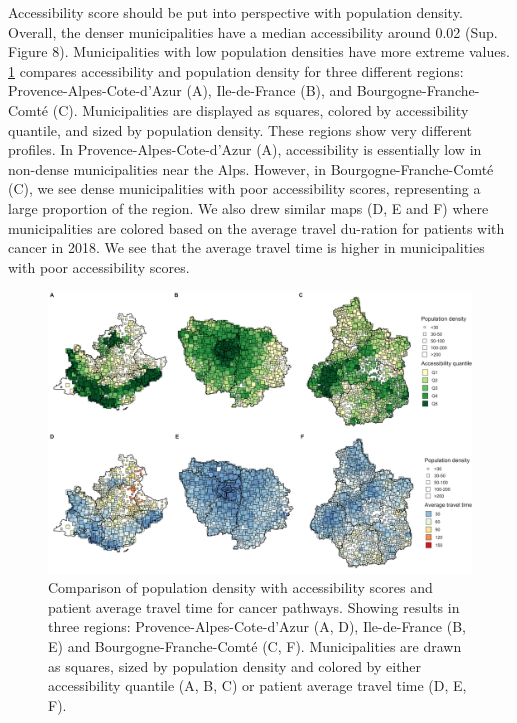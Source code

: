 Accessibility score should be put into perspective with population density. Overall, the denser municipalities have a median accessibility around 0.02 (Sup. Figure 8). Municipalities with low population densities have more extreme values.  \cref{fig:accessibility-vs-density} compares accessibility and population density for three different regions: Provence-Alpes-Cote-d'Azur (A), Ile-de-France (B), and Bourgogne-Franche-Comté (C). Municipalities are displayed as squares, colored by accessibility quantile, and sized by population density. These regions show very different profiles. In Provence-Alpes-Cote-d'Azur (A), accessibility is essentially low in non-dense municipalities near the Alps. However, in Bourgogne-Franche-Comté (C), we see dense municipalities with poor accessibility scores, representing a large proportion of the region. We also drew similar maps (D, E and F) where municipalities are colored based on the average travel du-ration for patients with cancer in 2018. We see that the average travel time is higher in municipalities with poor accessibility scores.

\begin{figure}[h]
    \includegraphics[width=\textwidth]{images/camion/fig3_accessibility_vs_density_scatter_map.png}
    \centering
    \caption{
        Comparison of population density with accessibility scores and patient average travel time for cancer pathways. Showing results in three regions: Provence-Alpes-Cote-d’Azur (A, D), Ile-de-France (B, E) and Bourgogne-Franche-Comté (C, F). Municipalities are drawn as squares, sized by population density and colored by either accessibility quantile (A, B, C) or patient average travel time (D, E, F).
    }
    \label{fig:accessibility-vs-density}
\end{figure}

